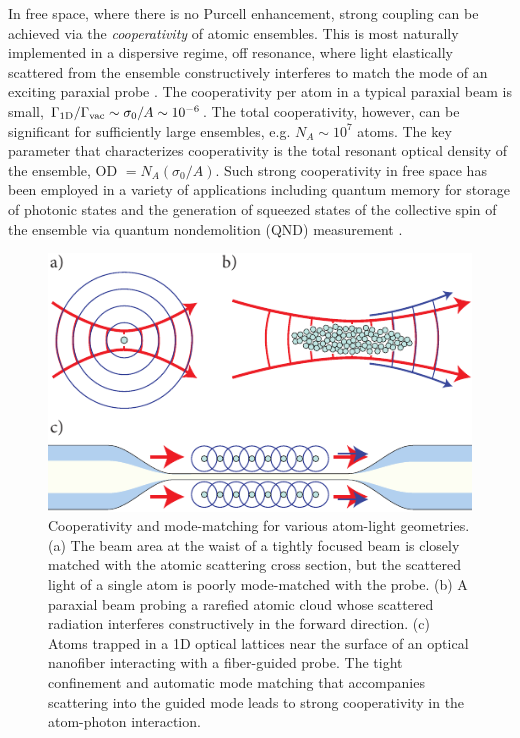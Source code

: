\documentclass[aps,pra,twocolumn]{revtex4-1} %
\newcommand{\oneD}{{\rm 1D}}
\newcommand{\vac}{{\rm vac}}
\begin{document}
In free space, where there is no Purcell enhancement, strong coupling can be achieved via the {\em cooperativity} of atomic ensembles.  
This is most naturally implemented in a dispersive regime, off resonance, where light elastically scattered from the ensemble constructively interferes to match the mode of an exciting paraxial probe \cite{baragiola_three-dimensional_2014}.  The cooperativity per atom in a typical paraxial beam is small, $\Gamma_{\oneD}/\Gamma_{\vac} \sim \sigma_0/A  \sim 10^{-6}$.  
The total cooperativity, however, can be significant for sufficiently large ensembles, e.g. $N_A \sim  10^7$ atoms. The key parameter that characterizes cooperativity is the total resonant optical density of the ensemble, OD $= N_A (\sigma_0/A)$.  
Such strong cooperativity in free space has been employed in a variety of applications including quantum memory for storage of photonic states \cite{chaneliere_storage_2005} and the generation of squeezed states of the collective spin of the ensemble via quantum nondemolition (QND) measurement \cite{kuzmich_generation_2000, appel_mesoscopic_2009, takano_spin_2009, sewell_magnetic_2012}.   

\begin{figure}
\includegraphics[scale=0.80]{./Fig1}
\caption{Cooperativity and mode-matching for various atom-light geometries. (a) The  beam area at the waist of a tightly focused beam is closely matched with the atomic scattering cross section, but the scattered light of a single atom is poorly mode-matched with the probe. (b) A paraxial beam probing a rarefied atomic cloud whose scattered radiation interferes constructively in the forward direction. (c) Atoms trapped in a 1D optical lattices  near the surface of an optical nanofiber interacting with a fiber-guided probe. The tight confinement and automatic mode matching that accompanies scattering into the guided mode leads to strong cooperativity in the atom-photon interaction.}\label{Fig::ModeMatching}
\end{figure}
\end{document}
